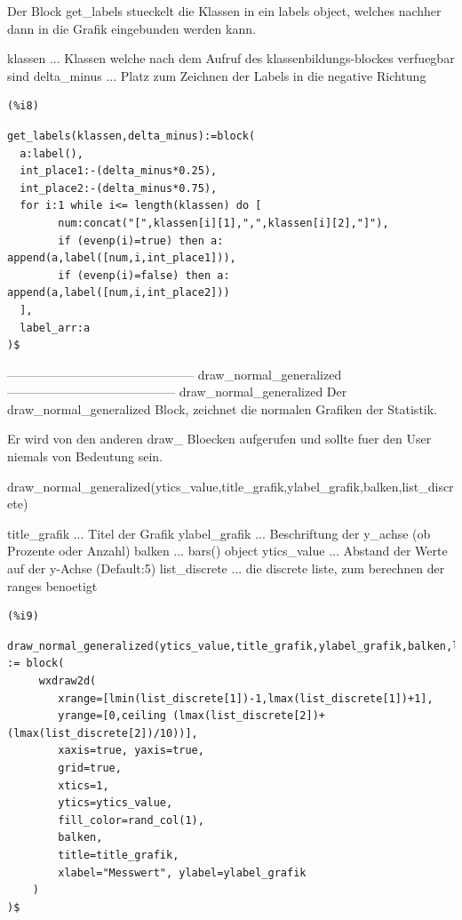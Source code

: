 \documentclass[12pt]{article}
\begin{document}
Der Block get\_labels stueckelt die Klassen in ein labels object, welches nachher dann in die Grafik eingebunden werden kann.

    klassen ... Klassen welche nach dem Aufruf des klassenbildungs-blockes verfuegbar sind
    delta\_minus ... Platz zum Zeichnen der Labels in die negative Richtung

\noindent
\begin{minipage}[t]{8ex}{\color{red}\bf
\begin{verbatim}
(%i8) 
\end{verbatim}}
\end{minipage}
\begin{minipage}[t]{\textwidth}{\color{blue}
\begin{verbatim}
get_labels(klassen,delta_minus):=block(
  a:label(),
  int_place1:-(delta_minus*0.25),
  int_place2:-(delta_minus*0.75),
  for i:1 while i<= length(klassen) do [
        num:concat("[",klassen[i][1],",",klassen[i][2],"]"),
        if (evenp(i)=true) then a: append(a,label([num,i,int_place1])),
        if (evenp(i)=false) then a: append(a,label([num,i,int_place2]))
  ],
  label_arr:a
)$
\end{verbatim}}
\end{minipage}

--------------------------------------------- draw\_normal\_generalized -----------------------------------------
draw\_normal\_generalized
    Der draw\_normal\_generalized Block, zeichnet die normalen Grafiken der Statistik.

    Er wird von den anderen draw\_ Bloecken aufgerufen und sollte fuer den User niemals von Bedeutung sein.


draw\_normal\_generalized(ytics\_value,title\_grafik,ylabel\_grafik,balken,list\_discrete)

title\_grafik    ... Titel der Grafik
ylabel\_grafik   ... Beschriftung der y\_achse (ob Prozente oder Anzahl)
balken          ... bars() object
ytics\_value     ... Abstand der Werte auf der y-Achse (Default:5)
list\_discrete   ... die discrete liste, zum berechnen der ranges benoetigt 

\noindent
\begin{minipage}[t]{8ex}{\color{red}\bf
\begin{verbatim}
(%i9) 
\end{verbatim}}
\end{minipage}
\begin{minipage}[t]{\textwidth}{\color{blue}
\begin{verbatim}
draw_normal_generalized(ytics_value,title_grafik,ylabel_grafik,balken,list_discrete) := block(
     wxdraw2d(
        xrange=[lmin(list_discrete[1])-1,lmax(list_discrete[1])+1], 
        yrange=[0,ceiling (lmax(list_discrete[2])+(lmax(list_discrete[2])/10))],
        xaxis=true, yaxis=true,
        grid=true,
        xtics=1, 
        ytics=ytics_value,
        fill_color=rand_col(1),
        balken,
        title=title_grafik,
        xlabel="Messwert", ylabel=ylabel_grafik
    )
)$
\end{verbatim}}
\end{minipage}
\end{document}
